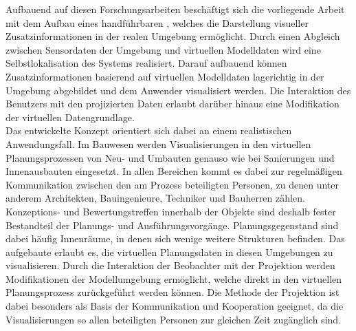 Aufbauend auf diesen Forschungsarbeiten beschäftigt sich die vorliegende Arbeit mit dem Aufbau eines handführbaren , welches die Darstellung visueller Zusatzinformationen in der realen Umgebung ermöglicht. Durch einen Abgleich zwischen Sensordaten der Umgebung und virtuellen Modelldaten wird eine Selbstlokalisation des Systems realisiert. Darauf aufbauend können Zusatzinformationen basierend auf virtuellen Modelldaten lagerichtig in der Umgebung abgebildet und dem Anwender visualisiert werden. Die Interaktion des Benutzers mit den projizierten Daten erlaubt darüber hinaus eine Modifikation der virtuellen Datengrundlage.\\

Das entwickelte Konzept orientiert sich dabei an einem realistischen Anwendungsfall. Im Bauwesen werden Visualisierungen in den virtuellen Planungsprozessen von Neu- und Umbauten genauso wie bei Sanierungen und Innenausbauten eingesetzt. In allen Bereichen kommt es dabei zur regelmäßigen Kommunikation zwischen den am Prozess beteiligten Personen, zu denen unter anderem Architekten, Bauingenieure, Techniker und Bauherren zählen. Konzeptions- und Bewertungstreffen innerhalb der Objekte sind deshalb fester Bestandteil der Planungs- und Ausführungsvorgänge. Planungsgegenstand sind dabei häufig Innenräume, in denen sich wenige weitere Strukturen befinden. Das aufgebaute \kps{} erlaubt es, die virtuellen Planungsdaten in diesen Umgebungen zu visualisieren. Durch die Interaktion der Beobachter mit der Projektion werden Modifikationen der Modellumgebung ermöglicht, welche direkt in den virtuellen Planungsprozess zurückgeführt werden können. Die Methode der Projektion ist dabei besonders als Basis der Kommunikation und Kooperation geeignet, da die Visualisierungen so allen beteiligten Personen zur gleichen Zeit zugänglich sind.\\


